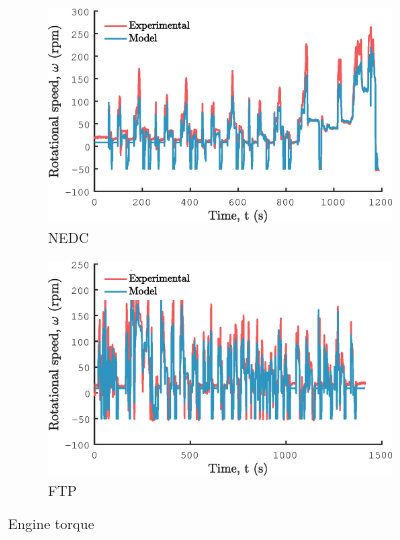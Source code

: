 \begin{figure}[ht]
  \centering
  \begin{subfigure}[b]{0.49\textwidth}
    \includegraphics[width=\textwidth]{figures/model/NEDC/T_engine.eps}
    \caption{NEDC}
    \label{fig:NEDC_T_engine}
  \end{subfigure}
  \begin{subfigure}[b]{0.49\textwidth}
    \includegraphics[width=\textwidth]{figures/model/FTP/T_engine.eps}
    \caption{FTP}
    \label{fig:FTP_T_engine}
  \end{subfigure}
  \caption{Engine torque}\label{fig:T_engine}
\end{figure}

